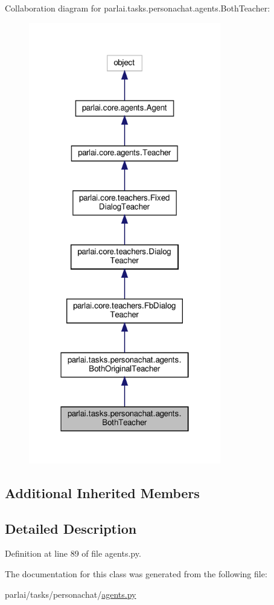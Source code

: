 Collaboration diagram for parlai.\+tasks.\+personachat.\+agents.\+Both\+Teacher\+:
\nopagebreak
\begin{figure}[H]
\begin{center}
\leavevmode
\includegraphics[width=238pt]{dc/de9/classparlai_1_1tasks_1_1personachat_1_1agents_1_1BothTeacher__coll__graph}
\end{center}
\end{figure}
\subsection*{Additional Inherited Members}


\subsection{Detailed Description}


Definition at line 89 of file agents.\+py.



The documentation for this class was generated from the following file\+:\begin{DoxyCompactItemize}
\item 
parlai/tasks/personachat/\hyperlink{parlai_2tasks_2personachat_2agents_8py}{agents.\+py}\end{DoxyCompactItemize}
